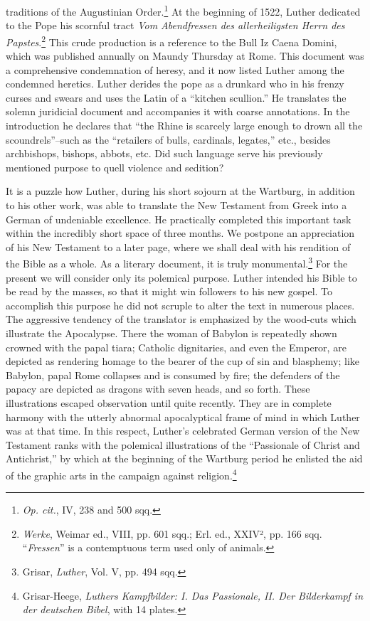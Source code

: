 traditions of the Augustinian Order.\footnote{\textit{Op. cit.}, IV, 238 and 500 sqq.}
At the beginning of 1522, Luther dedicated to the Pope his scornful tract
\textit{Vom Abendfressen des allerheiligsten Herrn des Papstes}.\footnote
{\textit{Werke}, Weimar ed., VIII, pp. 601 sqq.; Erl. ed., XXIV², pp. 166 sqq. “\textit{Fressen}” is a
contemptuous term used only of animals.}
This crude production is a reference to the Bull Iz Caena Domini,
which was published annually on Maundy Thursday at Rome. This
document was a comprehensive condemnation of heresy, and it now
listed Luther among the condemned heretics. Luther derides the
pope as a drunkard who in his frenzy curses and swears and uses the
Latin of a “kitchen scullion.” He translates the solemn juridicial document
and accompanies it with coarse annotations. In the introduction
he declares that “the Rhine is scarcely large enough to drown all
the scoundrels”--such as the “retailers of bulls, cardinals, legates,”
etc., besides archbishops, bishops, abbots, etc. Did such language serve
his previously mentioned purpose to quell violence and sedition?

It is a puzzle how Luther, during his short sojourn at the Wartburg, in
addition to his other work, was able to translate the New
Testament from Greek into a German of undeniable excellence. He
practically completed this important task within the incredibly short
space of three months. We postpone an appreciation of his New Testament
to a later page, where we shall deal with his rendition of the
Bible as a whole. As a literary document, it is truly monumental.\footnote{Grisar, \textit{Luther}, Vol. V, pp. 494 sqq.}
For the present we will consider only its polemical purpose. Luther
intended his Bible to be read by the masses, so that it might win followers
to his new gospel. To accomplish this purpose he did not
scruple to alter the text in numerous places. The aggressive tendency
of the translator is emphasized by the wood-cuts which illustrate
the Apocalypse. There the woman of Babylon is repeatedly shown
crowned with the papal tiara; Catholic dignitaries, and even the Emperor,
are depicted as rendering homage to the bearer of the cup of
sin and blasphemy; like Babylon, papal Rome collapses and is consumed by
fire; the defenders of the papacy are depicted as dragons with
seven heads, and so forth. These illustrations escaped observation until
quite recently. They are in complete harmony with the utterly abnormal
apocalyptical frame of mind in which Luther was at that
time. In this respect, Luther’s celebrated German version of the New
Testament ranks with the polemical illustrations of the “Passionale
of Christ and Antichrist,” by which at the beginning of the Wartburg period
he enlisted the aid of the graphic arts in the campaign
against religion.\footnote
{Grisar-Heege, \textit{Luthers Kampfbilder: I. Das Passionale, II. Der Bilderkampf in der
deutschen Bibel}, with 14 plates.}

